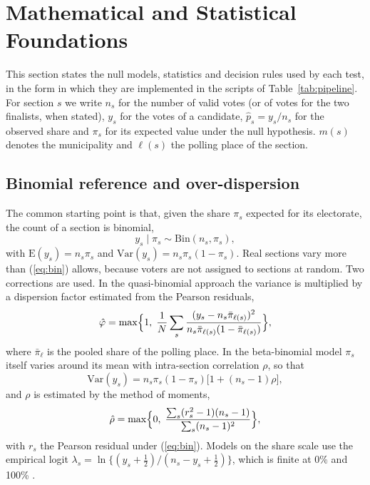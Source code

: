 \section{Mathematical and Statistical Foundations}
\label{sec:foundations}

This section states the null models, statistics and decision rules used by
each test, in the form in which they are implemented in the scripts of
Table~\ref{tab:pipeline}. For section $s$ we write $n_s$ for the number of
valid votes (or of votes for the two finalists, when stated), $y_s$ for the
votes of a candidate, $\hat p_s=y_s/n_s$ for the observed share and $\pi_s$
for its expected value under the null hypothesis. $m(s)$ denotes the
municipality and $\ell(s)$ the polling place of the section.

\subsection{Binomial reference and over-dispersion}

The common starting point is that, given the share $\pi_s$ expected for its
electorate, the count of a section is binomial,
\begin{equation}
y_s \mid \pi_s \sim \mathrm{Bin}(n_s,\pi_s),
\label{eq:bin}
\end{equation}
with $\mathrm{E}(y_s)=n_s\pi_s$ and $\mathrm{Var}(y_s)=n_s\pi_s(1-\pi_s)$.
Real sections vary more than (\ref{eq:bin}) allows, because voters are not
assigned to sections at random. Two corrections are used. In the
quasi-binomial approach \cite{wedderburn1974} the variance is multiplied by
a dispersion factor estimated from the Pearson residuals,
\begin{equation}
\hat\varphi=\max\Bigl\{1,\;\frac{1}{N}\sum_{s}\frac{(y_s-n_s\bar\pi_{\ell(s)})^2}{n_s\bar\pi_{\ell(s)}(1-\bar\pi_{\ell(s)})}\Bigr\},
\label{eq:phi}
\end{equation}
where $\bar\pi_\ell$ is the pooled share of the polling place. In the
beta-binomial model \cite{williams1982} $\pi_s$ itself varies around its
mean with intra-section correlation $\rho$, so that
\begin{equation}
\mathrm{Var}(y_s)=n_s\pi_s(1-\pi_s)\bigl[1+(n_s-1)\rho\bigr],
\label{eq:bb}
\end{equation}
and $\rho$ is estimated by the method of moments,
\begin{equation}
\hat\rho=\max\Bigl\{0,\;\frac{\sum_s(r_s^2-1)(n_s-1)}{\sum_s(n_s-1)^2}\Bigr\},
\label{eq:rho}
\end{equation}
with $r_s$ the Pearson residual under (\ref{eq:bin}). Models on the share scale use the
empirical logit $\lambda_s=\ln\{(y_s+\tfrac12)/(n_s-y_s+\tfrac12)\}$, which
is finite at 0\% and 100\% \cite{haldane1956}.

